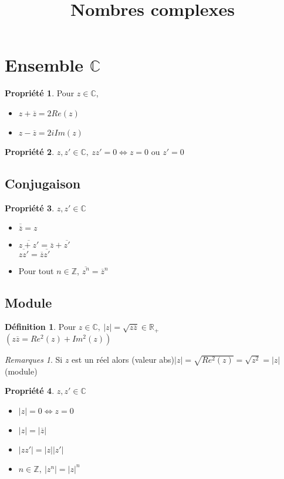 \documentclass[fleqn]{article}
\title{Nombres complexes}
\date{}
\theoremstyle{definition} \newtheorem*{defi}{D\'efinition}
\theoremstyle{definition} \newtheorem*{theo}{Th\'eor\`eme}
\theoremstyle{definition} \newtheorem*{coro}{Corollaire}
\theoremstyle{remark} \newtheorem*{rqs}{Remarques}
\theoremstyle{definition} \newtheorem*{prop}{Propri\'et\'e}
\begin{document}
\maketitle

\section{Ensemble $\mathbb{C}$}
\begin{prop} Pour $z \in \mathbb{C}$,
	\begin{itemize}
		\item $z + \overline{z} = 2Re(z)$
		\item $z - \overline{z} = 2iIm(z)$
	\end{itemize}
\end{prop}

\begin{prop}
	$z,z' \in \mathbb{C},\ zz' = 0 \Leftrightarrow z = 0$ ou $z' = 0$
\end{prop}

\subsection{Conjugaison}
\begin{prop} $z,z' \in \mathbb{C}$
	\begin{itemize}
		\item $\overline{\overline{z}} = z$
		\item $\overline{z + z'} = \overline{z} + \overline{z'}$\\
			$\overline{zz'} = \overline{z} \overline{z'}$
		\item Pour tout $n \in \mathbb{Z}$, $\overline{z^n} = \overline{z}^n$
	\end{itemize}
\end{prop}

\subsection{Module}
\begin{defi}
	Pour $z \in \mathbb{C},\ |z| = \sqrt{z\overline{z}} \in \mathbb{R}_+$ \\
	$(z\overline{z} = Re^2(z) + Im^2(z))$
	\begin{rqs}
		Si $z$ est un r\'eel alors (valeur abs)$|z| = \sqrt{Re^2(z)} = \sqrt{z^2} = |z|$(module)
	\end{rqs}
\end{defi}


\begin{prop} $z,z' \in \mathbb{C}$
	\begin{itemize}
		\item $|z| = 0 \Leftrightarrow z = 0$
		\item $|z| = |\overline{z}|$
		\item $|zz'| = |z||z'|$
		\item $n \in \mathbb{Z},\ |z^n| = |z|^n$
	\end{itemize}
\end{prop}
\end{document}
